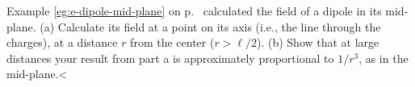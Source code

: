 Example \ref{eg:e-dipole-mid-plane} on p.~\pageref{eg:e-dipole-mid-plane} calculated the field
of a dipole in its mid-plane. (a) Calculate its field at a point on its axis (i.e., the line through the charges), at a distance $r$
from the center ($r>\ell/2$). (b) Show that at large distances your result from part a is approximately proportional to
$1/r^3$, as in the mid-plane.<%
